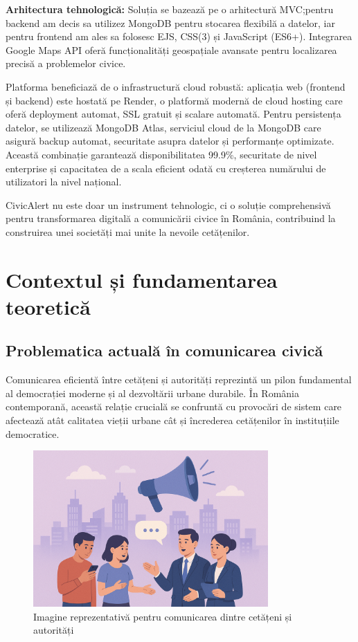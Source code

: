 \documentclass[12pt,a4paper]{report}
\begin{document}
\textbf{Arhitectura tehnologică:}
Soluția se bazează pe o arhitectură MVC;pentru backend am decis sa utilizez MongoDB pentru stocarea flexibilă a datelor, iar pentru frontend am ales sa folosesc  EJS, CSS(3) și JavaScript (ES6+). Integrarea Google Maps API oferă funcționalități geospațiale avansate pentru localizarea precisă a problemelor civice.

Platforma beneficiază de o infrastructură cloud robustă: aplicația web (frontend și backend) este hostată pe Render, o platformă modernă de cloud hosting care oferă deployment automat, SSL gratuit și scalare automată. Pentru persistența datelor, se utilizează MongoDB Atlas, serviciul cloud de la MongoDB care asigură backup automat, securitate asupra datelor și performanțe optimizate. Această combinație garantează disponibilitatea 99.9\%, securitate de nivel enterprise și capacitatea de a scala eficient odată cu creșterea numărului de utilizatori la nivel național.

CivicAlert nu este doar un instrument tehnologic, ci o soluție comprehensivă pentru transformarea digitală a comunicării civice în România, contribuind la construirea unei societăți mai unite la nevoile cetățenilor.


\newpage
\chapter{Contextul și fundamentarea teoretică}

\section{Problematica actuală în comunicarea civică}

Comunicarea eficientă între cetățeni și autorități reprezintă un pilon fundamental al democrației moderne și al dezvoltării urbane durabile. În România contemporană, această relație crucială se confruntă cu provocări de sistem care afectează atât calitatea vieții urbane cât și încrederea cetățenilor în instituțiile democratice.

\begin{figure}[H]
    \centering
    \includegraphics[width=0.8\textwidth]{problema in comunicare.png}
    \caption{Imagine reprezentativă pentru comunicarea dintre cetățeni și autorități}
    \label{fig:problema_comunicare}
\end{figure}
\end{document}
